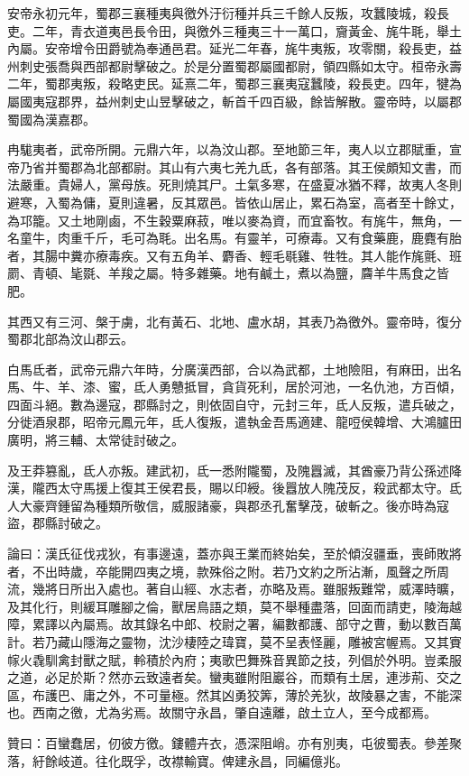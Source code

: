 \begin{pinyinscope}
安帝永初元年，蜀郡三襄種夷與徼外汙衍種并兵三千餘人反叛，攻蠶陵城，殺長吏。二年，青衣道夷邑長令田，與徼外三種夷三十一萬口，齎黃金、旄牛毦，舉土內屬。安帝增令田爵號為奉通邑君。延光二年春，旄牛夷叛，攻零關，殺長吏，益州刺史張喬與西部都尉擊破之。於是分置蜀郡屬國都尉，領四縣如太守。桓帝永壽二年，蜀郡夷叛，殺略吏民。延熹二年，蜀郡三襄夷寇蠶陵，殺長吏。四年，犍為屬國夷寇郡界，益州刺史山昱擊破之，斬首千四百級，餘皆解散。靈帝時，以屬郡蜀國為漢嘉郡。

冉駹夷者，武帝所開。元鼎六年，以為汶山郡。至地節三年，夷人以立郡賦重，宣帝乃省并蜀郡為北部都尉。其山有六夷七羌九氐，各有部落。其王侯頗知文書，而法嚴重。貴婦人，黨母族。死則燒其尸。土氣多寒，在盛夏冰猶不釋，故夷人冬則避寒，入蜀為傭，夏則違暑，反其眾邑。皆依山居止，累石為室，高者至十餘丈，為邛籠。又土地剛鹵，不生穀粟麻菽，唯以麥為資，而宜畜牧。有旄牛，無角，一名童牛，肉重千斤，毛可為毦。出名馬。有靈羊，可療毒。又有食藥鹿，鹿麑有胎者，其腸中糞亦療毒疾。又有五角羊、麝香、輕毛毼雞、牲牲。其人能作旄氈、班罽、青頓、毞毲、羊羧之屬。特多雜藥。地有鹹土，煮以為鹽，麡羊牛馬食之皆肥。

其西又有三河、槃于虜，北有黃石、北地、盧水胡，其表乃為徼外。靈帝時，復分蜀郡北部為汶山郡云。

白馬氐者，武帝元鼎六年時，分廣漢西部，合以為武都，土地險阻，有麻田，出名馬、牛、羊、漆、蜜，氐人勇戇抵冒，貪貨死利，居於河池，一名仇池，方百傾，四面斗絕。數為邊寇，郡縣討之，則依固自守，元封三年，氐人反叛，遣兵破之，分徙酒泉郡，昭帝元鳳元年，氐人復叛，遣執金吾馬適建、龍哣侯韓增、大鴻臚田廣明，將三輔、太常徒討破之。

及王莽篡亂，氐人亦叛。建武初，氐一悉附隴蜀，及隗囂滅，其酋豪乃背公孫述降漢，隴西太守馬援上復其王侯君長，賜以印綬。後囂放人隗茂反，殺武都太守。氐人大豪齊鍾留為種類所敬信，威服諸豪，與郡丞孔奮擊茂，破斬之。後亦時為寇盜，郡縣討破之。

論曰：漢氏征伐戎狄，有事邊遠，蓋亦與王業而終始矣，至於傾沒疆垂，喪師敗將者，不出時歲，卒能開四夷之境，款殊俗之附。若乃文約之所沾漸，風聲之所周流，幾將日所出入處也。著自山經、水志者，亦略及焉。雖服叛難常，威澤時曠，及其化行，則緩耳雕腳之倫，獸居鳥語之類，莫不舉種盡落，回面而請吏，陵海越障，累譯以內屬焉。故其錄名中郎、校尉之署，編數都護、部守之曹，動以數百萬計。若乃藏山隱海之靈物，沈沙棲陸之瑋寶，莫不呈表怪麗，雕被宮幄焉。又其賨幏火毳馴禽封獸之賦，軨積於內府；夷歌巴舞殊音異節之技，列倡於外明。豈柔服之道，必足於斯？然亦云致遠者矣。蠻夷雖附阻巖谷，而類有土居，連涉荊、交之區，布護巴、庸之外，不可量極。然其凶勇狡筭，薄於羌狄，故陵暴之害，不能深也。西南之徼，尤為劣焉。故關守永昌，肇自遠離，啟土立人，至今成都焉。

贊曰：百蠻蠢居，仞彼方徼。鏤體卉衣，憑深阻峭。亦有別夷，屯彼蜀表。參差聚落，紆餘岐道。往化既孚，改襟輸寶。俾建永昌，同編億兆。


\end{pinyinscope}
